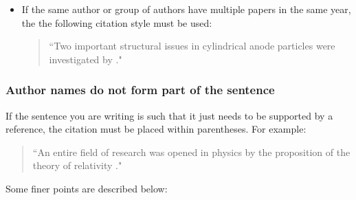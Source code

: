\begin{itemize}
\item If the same author or group of authors have multiple papers in the same year, the the following citation style must be used:
\begin{quote}
``Two important structural issues in cylindrical anode particles were investigated by \citet{2015IJSSChakraborty, 2015JPSChakraborty}."
\end{quote}


\end{itemize}


\subsubsection{Author names do not form part of the sentence}


If the sentence you are writing is such that it just needs to be supported by a reference, the citation must be placed within parentheses. For example:
\begin{quote}
``An entire field of research was opened in physics by the proposition of the theory of relativity \citep{Einstein3}." 
\end{quote}

Some finer points are described below:

